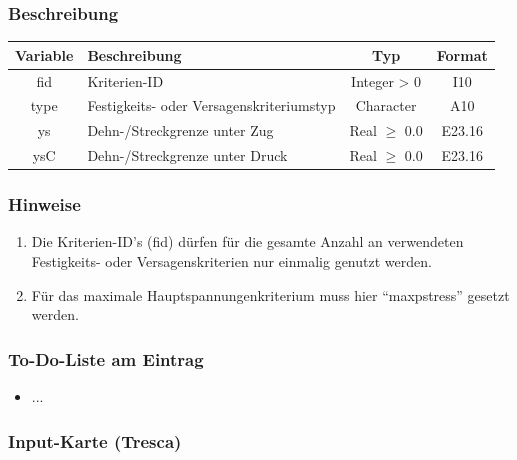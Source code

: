 \documentclass[11pt,titlepage,listof=totoc,bibliography=totoc,twoside]{scrreprt}
\begin{document}
{{\subsubsection{Beschreibung}

\begin{tabularx}{\textwidth}{cXcc}
\toprule
Variable& Beschreibung														& Typ			& Format\\
\midrule
fid	& Kriterien-ID														& Integer > 0		& I10	\\
type	& Festigkeits- oder Versagenskriteriumstyp										& Character		& A10	\\
ys	& Dehn-/Streckgrenze unter Zug												& Real $\ge$ 0.0	& E23.16\\
ysC	& Dehn-/Streckgrenze unter Druck											& Real $\ge$ 0.0	& E23.16\\
\bottomrule
\end{tabularx}

\subsubsection{Hinweise}

\begin{enumerate}
\item Die Kriterien-ID's (fid) dürfen für die gesamte Anzahl an verwendeten Festigkeits- oder Versagenskriterien nur einmalig genutzt werden.
\item Für das maximale Hauptspannungenkriterium muss hier ``maxpstress'' gesetzt werden.
\end{enumerate}

\subsubsection{To-Do-Liste am Eintrag}

\begin{itemize}
\item ...
\end{itemize}

\newpage

\subsubsection{Input-Karte (Tresca)}

}}
\end{document}
